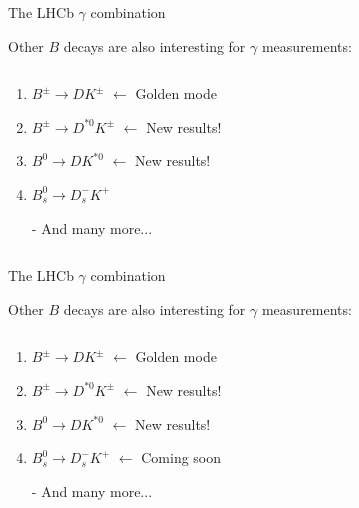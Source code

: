 \documentclass[dvipsnames]{beamer}
\begin{document}
\begin{frame}{The LHCb $\gamma$ combination}
  \begin{center}
    \Large Other $B$ decays are also interesting for $\gamma$ measurements:
  \end{center}
  \vspace{0.2cm}
  \begin{columns}
    \begin{column}{0.6\textwidth}
      \vspace{1.5cm}
      \begin{enumerate}
        \item{$B^\pm\to DK^\pm$ $\leftarrow$ Golden mode}
        \item{$B^\pm\to D^{*0}K^\pm$ $\leftarrow$ New results!}
        \item{$B^0\to DK^{*0}$ $\leftarrow$ New results!}
        \item{$B_s^0\to D_s^-K^+$}
        \item[-]{And many more...}
      \end{enumerate}
      \vspace{1.5cm}
    \end{column}
    \begin{column}{0.4\textwidth}
    \end{column}
  \end{columns}
\end{frame}

\begin{frame}{The LHCb $\gamma$ combination}
  \begin{center}
    \Large Other $B$ decays are also interesting for $\gamma$ measurements:
  \end{center}
  \vspace{0.2cm}
  \begin{columns}
    \begin{column}{0.6\textwidth}
      \vspace{1.5cm}
      \begin{enumerate}
        \item{$B^\pm\to DK^\pm$ $\leftarrow$ Golden mode}
        \item{$B^\pm\to D^{*0}K^\pm$ $\leftarrow$ New results!}
        \item{$B^0\to DK^{*0}$ $\leftarrow$ New results!}
        \item{$B_s^0\to D_s^-K^+$ $\leftarrow$ Coming soon}
        \item[-]{And many more...}
      \end{enumerate}
      \vspace{1.5cm}
    \end{column}
    \begin{column}{0.4\textwidth}
    \end{column}
  \end{columns}
\end{frame}
\end{document}
